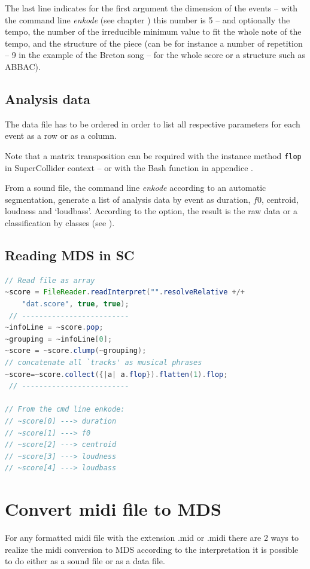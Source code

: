  The last line indicates for the first argument the dimension of the events -- with the command line \textsl{enkode} (see chapter ) this number is 5 -- and optionally the tempo, the number of the irreducible minimum value to fit the whole note of the tempo, and the structure of the piece (can be for instance a number of repetition -- 9 in the example of the Breton song -- for the whole score or a structure such as ABBAC).

\subsection{Analysis data}

The data file has to be ordered in order to list all respective parameters for each event as a row or as a column.

Note that a matrix transposition can be required with the instance method \texttt{flop} in SuperCollider context -- or with the Bash function \textsl{} in appendice .

\bigskip 

From a sound file, the command line \textsl{enkode} according to an automatic segmentation, generate a list of analysis data by event as duration, $f0$, centroid, loudness and `loudbass'. According to the option, the result is the raw data or a classification by classes (see ).

\subsection{Reading MDS in SC}
\label{mds2sc}

\begin{lstlisting}[language=Java]
// Read file as array
~score = FileReader.readInterpret("".resolveRelative +/+  
    "dat.score", true, true);
 // -------------------------
~infoLine = ~score.pop;
~grouping = ~infoLine[0];
~score = ~score.clump(~grouping);
// concatenate all `tracks' as musical phrases 
~score=~score.collect({|a| a.flop}).flatten(1).flop;
 // -------------------------
 
// From the cmd line enkode:
// ~score[0] ---> duration
// ~score[1] ---> f0
// ~score[2] ---> centroid
// ~score[3] ---> loudness
// ~score[4] ---> loudbass
\end{lstlisting}

\section{Convert midi file to MDS}
\label{cmftmds}
For any formatted midi file with the extension .mid or .midi there are 2 ways to realize the midi conversion to MDS according to the interpretation it is possible to do either as a sound file or as a data file.

